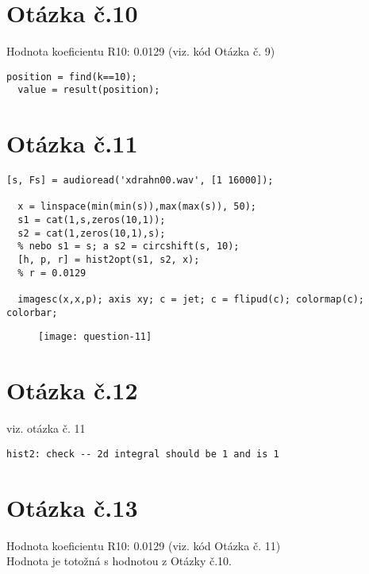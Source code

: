 \documentclass[a4paper,11pt]{article}
\begin{document}
\section{Otázka č.10}

Hodnota koeficientu R10: 0.0129 (viz. kód Otázka č. 9)\\

\lstset{language=Matlab}
\begin{lstlisting}[frame=single,breaklines]
  position = find(k==10);
  value = result(position);
\end{lstlisting}

\section{Otázka č.11}

\lstset{language=Matlab}
\begin{lstlisting}[frame=single,breaklines]
  [s, Fs] = audioread('xdrahn00.wav', [1 16000]);

  x = linspace(min(min(s)),max(max(s)), 50);
  s1 = cat(1,s,zeros(10,1));
  s2 = cat(1,zeros(10,1),s);
  % nebo s1 = s; a s2 = circshift(s, 10);
  [h, p, r] = hist2opt(s1, s2, x);
  % r = 0.0129

  imagesc(x,x,p); axis xy; c = jet; c = flipud(c); colormap(c); colorbar;
\end{lstlisting}

\begin{figure}[H]
  \centering
  \texttt{[image: question-11]}
\end{figure}

\section{Otázka č.12}

viz. otázka č. 11

\lstset{language=Matlab}
\begin{lstlisting}[frame=single,breaklines]
  hist2: check -- 2d integral should be 1 and is 1
\end{lstlisting}

\section{Otázka č.13}

Hodnota koeficientu R10: 0.0129 (viz. kód Otázka č. 11)\\

Hodnota je totožná s hodnotou z Otázky č.10.

\nocite{*}




\newpage
\thispagestyle{empty}

\end{document}

